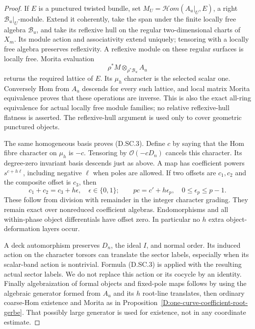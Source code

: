 \begin{proof}
If $E$ is a punctured twisted bundle, set
$M_U=\mathcal Hom(A_u|_U,E)$, a right
$\mathcal B_u|_U$-module. Extend it coherently, take
the span under the finite locally free algebra
$\mathcal B_u$, and take its reflexive hull on the
regular two-dimensional charts of $X_m$. Its module
action and associativity extend uniquely; tensoring
with a locally free algebra preserves reflexivity.
A reflexive module on these regular surfaces is
locally free. Morita evaluation
\[
                  \rho^*M\otimes_{\rho^*\mathcal B_u} A_u
                                                        \tag{D.SC.5}
\]
returns the required lattice of $E$. Its $\mu_h$
character is the selected scalar one. Conversely
Hom from $A_u$ descends for every such lattice, and
local matrix Morita equivalence proves that these
operations are inverse. This is also the exact
all-ring equivalence for actual locally free module
families; no relative reflexive-hull flatness is
asserted. The reflexive-hull argument is used only
to cover geometric punctured objects.

The same homogeneous basis proves (D.SC.3). Define
$c$ by saying that the Hom fibre character on
$\mu_h$ is $-c$. Tensoring by $\mathcal O(-cD_n)$
cancels this character. Its degree-zero invariant
basis descends just as above. A map has coefficient
powers $s^{c+h\ell}$, including negative $\ell$
when poles are allowed. If two offsets are $c_1,c_2$
and the composite offset is $c_3$, then
\[
 c_1+c_2=c_3+h\epsilon,\quad \epsilon\in\{0,1\};
 \qquad pc=c'+h\epsilon_p,\quad0\leq\epsilon_p\leq p-1.
                                                        \tag{D.SC.6}
\]
These follow from division with remainder in the
integer character grading. They remain exact over
nonreduced coefficient algebras. Endomorphisms and
all within-phase object differentials have offset
zero. In particular no $h$ extra object-deformation
layers occur.

A deck automorphism preserves $D_n$, the ideal $I$,
and normal order. Its induced action on the character
torsors can translate the sector labels, especially
when its scalar-band action is nontrivial. Formula
(D.SC.3) is applied with the resulting actual sector
labels. We do not replace this action or its cocycle
by an identity. Finally algebraization of formal
objects and fixed-pole maps follows by using the
algebraic generator formed from $A_u$ and its $h$
root-line translates, then ordinary coarse-Hom
existence and Morita as in
Proposition~\ref{D:one-curve-coefficient-root-gerbe}.
That possibly large generator is used for existence,
not in any coordinate estimate.
\end{proof}

